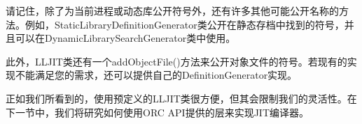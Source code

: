 请记住，除了为当前进程或动态库公开符号外，还有许多其他可能公开名称的方法。例如，StaticLibraryDefinitionGenerator类公开在静态存档中找到的符号，并且可以在DynamicLibrarySearchGenerator类中使用。

此外，LLJIT类还有一个addObjectFile()方法来公开对象文件的符号。若现有的实现不能满足您的需求，还可以提供自己的DefinitionGenerator实现。

正如我们所看到的，使用预定义的LLJIT类很方便，但其会限制我们的灵活性。在下一节中，我们将研究如何使用ORC API提供的层来实现JIT编译器。

















